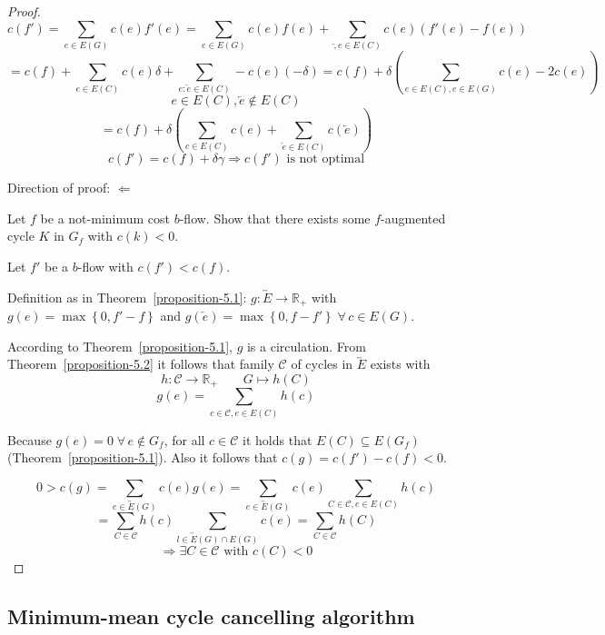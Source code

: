 \documentclass[a4paper]{article}
\theoremstyle{definition}
\newcommand{\set}[1]{\left\{#1\right\}}
\newcommand{\fall}{\;\forall\,}
\begin{document}
\begin{proof}
  \[
    c(f') = \sum_{e \in E(G)} c(e) f'(e) = \sum_{e \in E(G)} c(e) f(e) + \sum_{\overleftarrow, e \in E(C)} c(e)(f'(e) - f(e))
  \] \[
    = c(f) + \sum_{e \in E(C)} c(e) \delta + \sum_{e: \overleftarrow{e} \in E(C)} -c(e)(-\delta)
    = c(f) + \delta\left(\sum_{e \in E(C), e \in E(G)} c(e) - 2c(e)\right)
  \] \[
    e \in E(C), \overleftarrow{e} \notin E(C)
  \] \[
    = c(f) + \delta\left(\sum_{c \in E(C)} c(e) + \sum_{\overleftarrow{e} \in E(C)} c(\overleftarrow{e}) \right)
  \] \[
    c(f') = c(f) + \delta\gamma \Rightarrow c(f') \text{ is not optimal}
  \]

  Direction of proof: $\Leftarrow$

  Let $f$ be a not-minimum cost $b$-flow. Show that there exists some $f$-augmented cycle $K$ in $G_f$ with $c(k) < 0$.

  Let $f'$ be a $b$-flow with $c(f') < c(f)$.

  Definition as in Theorem~\ref{proposition-5.1}: $g: \overleftrightarrow{E} \rightarrow \mathbb{R}_+$ with $g(e) = \max\set{0, f' - f}$ and $g(\overleftarrow{e}) = \max\set{0, f - f'} \fall c \in E(G)$.

  According to Theorem~\ref{proposition-5.1}, $g$ is a circulation. From Theorem~\ref{proposition-5.2} it follows that family $\mathcal{C}$ of cycles in $\overleftrightarrow{E}$ exists with
  \[
    h: \mathcal{C} \rightarrow \mathbb{R}_+  \qquad G \mapsto h(C)
  \] \[
    g(e) = \sum_{c \in \mathcal{C}, e \in E(C)} h(c)
  \]

  Because $g(e) = 0 \fall e \notin G_f$, for all $c \in \mathcal{C}$ it holds that $E(C) \subseteq E(G_f)$ (Theorem~\ref{proposition-5.1}). Also it follows that $c(g) = c(f') - c(f) < 0$.

  \[
    0 > c(g)
      = \sum_{e \in \overleftrightarrow{E}(G)} c(e) g(e)
      = \sum_{e \in \overleftrightarrow{E}(G)} c(e) \sum_{C \in \mathcal{C}, e \in E(C)} h(c)
  \] \[
      = \sum_{C \in \mathcal{C}} h(c) \sum_{l \in \overleftrightarrow{E}(G) \cap E(G)} c(e)
      = \sum_{C \in \mathcal{C}} h(C)
  \] \[
    \Rightarrow \exists C \in \mathcal{C} \text{ with } c(C) < 0
  \]
\end{proof}

\subsection{Minimum-mean cycle cancelling algorithm}
\end{document}
